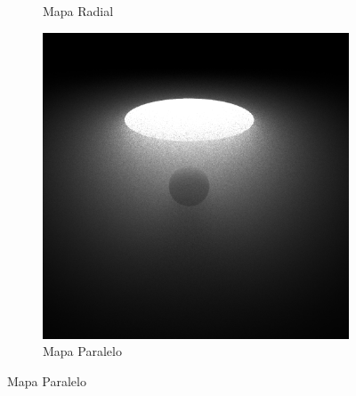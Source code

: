 \begin{figure}[h!]
{\begin{minipage}{\dimexpr .33\textwidth-\fboxsep-2\fboxrule}
\begin{subfigure}{\textwidth}
            \caption{Mapa Radial}
            \end{subfigure}%
  \end{minipage}
  \begin{minipage}{\dimexpr .33\textwidth-\fboxsep-2\fboxrule}
   \begin{subfigure}{\textwidth}
            \centering
            \includegraphics[width=\textwidth]{imagenes/spherep5}
            \caption{Mapa Paralelo}
            \end{subfigure}%
  \end{minipage}}
\end{figure}

\newpage

